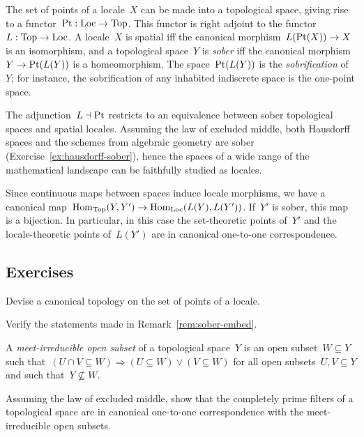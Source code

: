 \documentclass{ws-rv9x6}
\begin{document}
{\begin{remark}\label{rem:definition-sober}
The set of points of a locale~$X$ can be made into a topological space, giving
rise to a functor~$\mathrm{Pt} : \mathrm{Loc} \to \mathrm{Top}$. This functor is right adjoint
to the functor~$L : \mathrm{Top} \to \mathrm{Loc}$. A locale~$X$ is spatial iff the canonical
morphism~$L(\mathrm{Pt}(X)) \to X$ is an isomorphism, and a topological space~$Y$
is \emph{sober} iff the canonical morphism~$Y \to \mathrm{Pt}(L(Y))$ is a
homeomorphism. The space~$\mathrm{Pt}(L(Y))$ is the \emph{sobrification} of~$Y$; for
instance, the sobrification of any inhabited indiscrete space is the one-point
space.

The adjunction~$L \dashv \mathrm{Pt}$ restricts to an equivalence between sober
topological spaces and spatial locales. Assuming the law of excluded middle,
both Hausdorff spaces and the schemes from algebraic geometry are sober
(Exercise~\ref{ex:hausdorff-sober}), hence the spaces of a wide
range of the mathematical landscape can be faithfully studied as locales.\end{remark}

\begin{remark}\label{rem:sober-embed}
Since continuous maps between spaces induce locale morphisms, we
have a canonical map~$\mathrm{Hom}_{\mathrm{Top}}(Y,Y') \to \mathrm{Hom}_{\mathrm{Loc}}(L(Y),L(Y'))$. If~$Y'$ is
sober, this map is a bijection. In particular, in this case the set-theoretic points
of~$Y'$ and the locale-theoretic points of~$L(Y')$ are in canonical
one-to-one correspondence.
\end{remark}


\subsection*{Exercises}

\begin{exercise}%
\label{ex:canonical-topology}%
Devise a canonical to\-po\-logy on the set of points of a locale.
\end{exercise}

\begin{exercise}%
Verify the statements made in Remark~\ref{rem:sober-embed}.
\end{exercise}

\begin{exercise}%
\label{ex:hausdorff-sober}%
A \emph{meet-irreducible open subset} of a topological space~$Y$ is an
open subset~$W \subseteq Y$ such that~$(U \cap V \subseteq W) \Rightarrow (U
\subseteq W) \vee (V \subseteq W)$ for all open subsets~$U,V \subseteq Y$ and
such that~$Y \not\subseteq W$.
\begin{alphlist}[(c)]
\item Assuming the law of excluded middle, show that the completely prime
filters of a topological space are in canonical one-to-one correspondence with
the meet-irreducible open subsets.\smallskip


\end{alphlist}
\end{exercise}}
\end{document}
